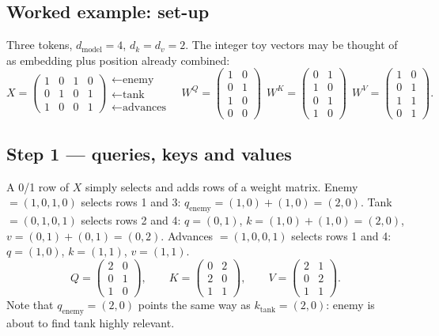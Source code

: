 \documentclass[11pt]{article}
\begin{document}
\subsection{Worked example: set-up}
Three tokens, $d_{\text{model}}=4$, $d_k=d_v=2$. The integer toy vectors may be thought of as embedding plus position already combined:
\[X=\begin{pmatrix}1&0&1&0\\0&1&0&1\\1&0&0&1\end{pmatrix}\!\begin{matrix}\leftarrow\text{enemy}\\\leftarrow\text{tank}\\\leftarrow\text{advances}\end{matrix}\quad
W^Q=\begin{pmatrix}1&0\\0&1\\1&0\\0&0\end{pmatrix}\ \ W^K=\begin{pmatrix}0&1\\1&0\\0&1\\1&0\end{pmatrix}\ \ W^V=\begin{pmatrix}1&0\\0&1\\1&1\\0&1\end{pmatrix}.\]

\subsection{Step 1 --- queries, keys and values}
A 0/1 row of $X$ simply selects and adds rows of a weight matrix. Enemy $=(1,0,1,0)$ selects rows 1 and 3: $q_{\text{enemy}}=(1,0)+(1,0)=(2,0)$. Tank $=(0,1,0,1)$ selects rows 2 and 4: $q=(0,1)$, $k=(1,0)+(1,0)=(2,0)$, $v=(0,1)+(0,1)=(0,2)$. Advances $=(1,0,0,1)$ selects rows 1 and 4: $q=(1,0)$, $k=(1,1)$, $v=(1,1)$.
\[Q=\begin{pmatrix}2&0\\0&1\\1&0\end{pmatrix},\qquad K=\begin{pmatrix}0&2\\2&0\\1&1\end{pmatrix},\qquad V=\begin{pmatrix}2&1\\0&2\\1&1\end{pmatrix}.\]
Note that $q_{\text{enemy}}=(2,0)$ points the same way as $k_{\text{tank}}=(2,0)$: enemy is about to find tank highly relevant.
\end{document}
